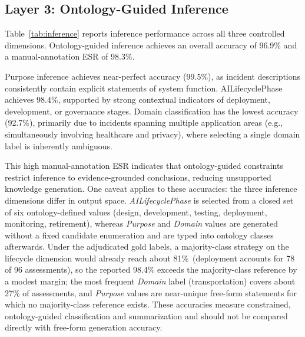 \documentclass[a4paper,fleqn]{cas-dc}
\begin{document}
\subsection{Layer 3: Ontology-Guided Inference}

Table~\ref{tab:inference} reports inference performance across all
three controlled dimensions.
Ontology-guided inference achieves an overall accuracy of 96.9\% and
a manual-annotation ESR of 98.3\%.

Purpose inference achieves near-perfect accuracy (99.5\%), as incident
descriptions consistently contain explicit statements of system
function.
AILifecyclePhase achieves 98.4\%, supported by strong contextual
indicators of deployment, development, or governance stages.
Domain classification has the lowest accuracy (92.7\%), primarily due
to incidents spanning multiple application areas (e.g.,
simultaneously involving healthcare and privacy), where selecting a
single domain label is inherently ambiguous.

This high manual-annotation ESR indicates that ontology-guided
constraints restrict inference to evidence-grounded
conclusions, reducing unsupported knowledge generation.
One caveat applies to these accuracies: the three inference
dimensions differ in output space. \textit{AILifecyclePhase} is
selected from a closed set of six ontology-defined values (design,
development, testing, deployment, monitoring, retirement), whereas
\textit{Purpose} and \textit{Domain} values are generated without a
fixed candidate enumeration and are typed into ontology classes
afterwards. Under the adjudicated gold labels, a majority-class
strategy on the lifecycle dimension would already reach about
81\%~(deployment accounts for 78 of 96 assessments), so the reported
98.4\% exceeds the majority-class reference by a modest margin; the
most frequent \textit{Domain} label (transportation) covers about
27\% of assessments, and \textit{Purpose} values are near-unique
free-form statements for which no majority-class reference exists.
These accuracies measure constrained, ontology-guided classification
and summarization and should not be compared directly with free-form
generation accuracy.
\end{document}

